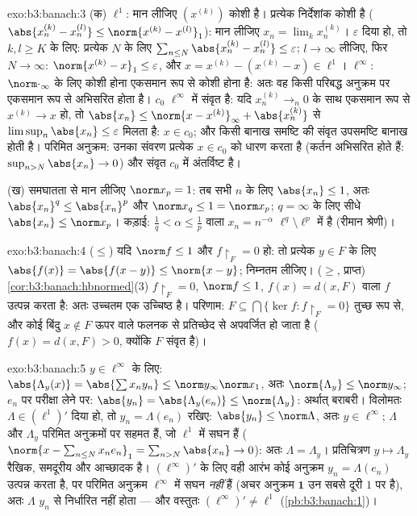 \begin{solution}{exo:b3:banach:3}
(क) $\ell^1$: मान लीजिए $(x^{(k)})$ कोशी है। प्रत्येक निर्देशांक कोशी है ($\abs{x^{(k)}_n - x^{(l)}_n} \leq \norm{x^{(k)} -
x^{(l)}}_1$):
मान लीजिए $x_n = \lim_kx^{(k)}_n$। $\varepsilon$ दिया हो, तो $k, l \geq K$ के लिए: प्रत्येक $N$ के लिए
$\sum_{n \leq N}\abs{x^{(k)}_n - x^{(l)}_n}
\leq \varepsilon$; $l \to \infty$ लीजिए, फिर $N \to
\infty$: $\norm{x^{(k)} - x}_1 \leq \varepsilon$, और $x =
x^{(k)} - (x^{(k)} - x) \in \ell^1$। $\ell^\infty$: $\norm\cdot_\infty$ के लिए कोशी
होना एकसमान रूप से कोशी होना है: अतः वह किसी परिबद्ध अनुक्रम पर
एकसमान रूप से अभिसरित होता है। $c_0$ $\ell^\infty$ में संवृत है: यदि $x^{(k)}_n \to_n 0$ के
साथ एकसमान रूप से $x^{(k)} \to x$ हो, तो
$\abs{x_n} \leq \norm{x - x^{(k)}}_\infty + \abs{x^{(k)}_n}$
से $\limsup_n\abs{x_n} \leq \varepsilon$ मिलता है: $x \in c_0$; और किसी बानाख समष्टि की संवृत उपसमष्टि बानाख
होती है। परिमित अनुक्रम: उनका संवरण प्रत्येक $x \in c_0$ को धारण करता है
(कर्तन अभिसरित होते हैं: $\sup_{n>N}\abs{x_n} \to 0$) और संवृत $c_0$ में अंतर्विष्ट है।

(ख) समघातता से मान लीजिए $\norm x_p = 1$: तब सभी $n$ के लिए $\abs{x_n} \leq
1$, अतः $\abs{x_n}^q \leq \abs{x_n}^p$
और $\norm
x_q \leq 1 = \norm x_p$; $q = \infty$ के लिए सीधे $\abs{x_n} \leq
\norm x_p$। कड़ाई: $\frac1q < \alpha \leq \frac1p$ वाला $x_n = n^{-\alpha}$ $\ell^q \setminus
\ell^p$ में है
(रीमान श्रेणी)।
\end{solution}

\begin{solution}{exo:b3:banach:4}
($\leq$) यदि $\norm f \leq 1$ और $f\restriction_F = 0$ हो: तो प्रत्येक $y \in F$ के लिए $\abs{f(x)} = \abs{f(x - y)} \leq \norm{x -
y}$; निम्नतम
लीजिए। ($\geq$, प्राप्त) \cref{cor:b3:banach:hbnormed}(3) $f\restriction_F = 0$, $\norm f \leq 1$, $f(x) = d(x, F)$ वाला $f$ उत्पन्न
करता है: अतः उच्चतम एक उच्चिष्ठ है। परिणाम: $F \subseteq \bigcap\{\ker
f : f\restriction_F = 0\}$ तुच्छ रूप से, और
कोई बिंदु $x \notin F$ ऊपर वाले फलनक से प्रतिच्छेद से अपवर्जित हो जाता है
($f(x) = d(x,F) > 0$, क्योंकि $F$ संवृत है)।
\end{solution}

\begin{solution}{exo:b3:banach:5}
$y \in \ell^\infty$ के लिए: $\abs{\Lambda_y(x)} =
\abs{\sum x_ny_n} \leq \norm y_\infty\norm x_1$, अतः $\norm{\Lambda_y} \leq \norm y_\infty$; $e_n$ पर परीक्षा लेने पर: $\abs{y_n} = \abs{\Lambda_y(e_n)} \leq \norm{\Lambda_y}$: अर्थात्
बराबरी। विलोमतः $\Lambda \in (\ell^1)'$ दिया हो, तो $y_n =
\Lambda(e_n)$ रखिए: $\abs{y_n} \leq \norm\Lambda$, अतः $y \in
\ell^\infty$;
$\Lambda$ और $\Lambda_y$ परिमित अनुक्रमों पर सहमत हैं, जो $\ell^1$ में सघन हैं
($\norm{x - \sum_{n\leq
N}x_ne_n}_1 = \sum_{n>N}\abs{x_n} \to 0$): अतः $\Lambda =
\Lambda_y$। प्रतिचित्रण $y \mapsto \Lambda_y$ रैखिक, समदूरीय और आच्छादक है।
$(\ell^\infty)'$ के लिए वही आरंभ कोई अनुक्रम $y_n = \Lambda(e_n)$ उत्पन्न करता है, पर परिमित
अनुक्रम $\ell^\infty$ में सघन \emph{नहीं} हैं (अचर अनुक्रम $\mathbf 1$ उन सबसे
दूरी $1$ पर है), अतः $\Lambda$ $y_n$ से निर्धारित नहीं होता --- और
वस्तुतः $(\ell^\infty)' \neq \ell^1$ (\cref{pb:b3:banach:1})।
\end{solution}

